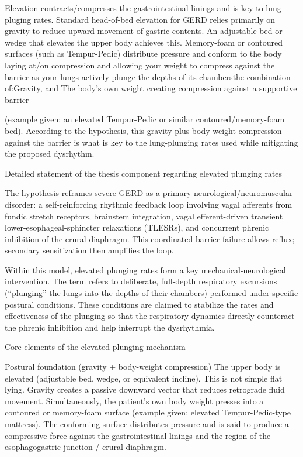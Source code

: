 Elevation contracts/compresses the gastrointestinal linings and is key to lung pluging rates. 
Standard head-of-bed elevation for GERD relies primarily on gravity to reduce upward movement of gastric contents. 
An adjustable bed or wedge that elevates the upper body achieves this. 
Memory-foam or contoured surfaces (such as Tempur-Pedic) distribute pressure and conform to the body laying at/on compression and allowing your weight to compress against the barrier as your lungs actively plunge the depths of its chambersthe combination of:Gravity, and  
The body’s own weight creating compression against a supportive barrier

(example given: an elevated Tempur-Pedic or similar contoured/memory-foam bed).  According to the hypothesis, this gravity-plus-body-weight compression against the barrier is what is key to the lung-plunging rates used while mitigating the proposed dysrhythm.

Detailed statement of the thesis component regarding elevated plunging rates

The hypothesis reframes severe GERD as a primary neurological/neuromuscular disorder: a self-reinforcing rhythmic feedback loop involving vagal afferents from fundic stretch receptors, brainstem integration, vagal efferent-driven transient lower-esophageal-sphincter relaxations (TLESRs), and concurrent phrenic inhibition of the crural diaphragm. This coordinated barrier failure allows reflux; secondary sensitization then amplifies the loop.

Within this model, elevated plunging rates form a key mechanical-neurological intervention. The term refers to deliberate, full-depth respiratory excursions (“plunging” the lungs into the depths of their chambers) performed under specific postural conditions. These conditions are claimed to stabilize the rates and effectiveness of the plunging so that the respiratory dynamics directly counteract the phrenic inhibition and help interrupt the dysrhythmia.

Core elements of the elevated-plunging mechanism

Postural foundation (gravity + body-weight compression)  
   The upper body is elevated (adjustable bed, wedge, or equivalent incline). This is not simple flat lying. Gravity creates a passive downward vector that reduces retrograde fluid movement. Simultaneously, the patient’s own body weight presses into a contoured or memory-foam surface (example given: elevated Tempur-Pedic-type mattress). The conforming surface distributes pressure and is said to produce a compressive force against the gastrointestinal linings and the region of the esophagogastric junction / crural diaphragm.  

